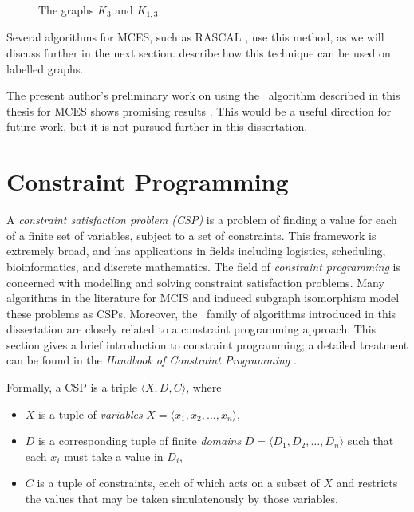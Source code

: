 \begin{figure}[htb]
    \centering
    
    \caption{The graphs $K_3$ and $K_{1,3}$.}
    \label{fig:k3-and-claw}
\end{figure}

Several algorithms for MCES, such as RASCAL
\citep{DBLP:journals/cj/RaymondGW02}, use this method, as we will discuss further
in the next section.  \citet{DBLP:conf/mco/VismaraV08} describe how this technique
can be used on labelled graphs.

The present author's preliminary work on using the \McSplit\ algorithm
described in this thesis for MCES shows promising results
\citep{trimble2018three}. This would be a useful direction for future work, but
it is not pursued further in this dissertation.


\section{Constraint Programming}

A \emph{constraint satisfaction problem (CSP)} is a problem of finding a value
for each of a finite set of variables, subject to a set of constraints.
This framework is extremely broad, and has applications in fields
including logistics, scheduling, bioinformatics, and discrete mathematics.
The field of \emph{constraint programming} is concerned with modelling
and solving constraint satisfaction problems. Many algorithms in the literature
for MCIS and induced subgraph isomorphism model these problems as CSPs.
Moreover, the \McSplit\ family of algorithms introduced in this dissertation
are closely related to a constraint programming approach.
This section gives a brief introduction to constraint programming;
a detailed treatment can be found in the \emph{Handbook of Constraint
Programming} \citep{DBLP:reference/fai/2}.

Formally, a CSP is a triple $\langle X, D, C\rangle$, where

\begin{itemize}
\item $X$ is a tuple of \emph{variables} $X = \langle x_1, x_2, \dots, x_n \rangle$,
\item $D$ is a corresponding tuple of finite \emph{domains} $D = \langle D_1, D_2, \dots, D_n\rangle$
  such that each $x_i$ must take a value in $D_i$,
\item $C$ is a tuple of constraints, each of which acts on a subset of $X$ and restricts
  the values that may be taken simulatenously by those variables.
\end{itemize}


